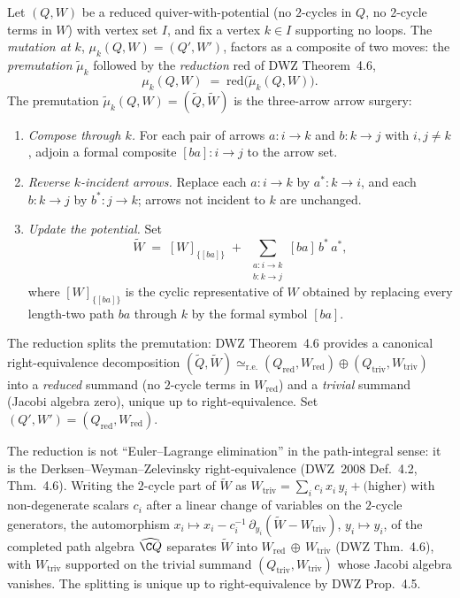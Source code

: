 \begin{definition}
\label{def:mutation-qp}
Let $(Q, W)$ be a reduced quiver-with-potential
(no $2$-cycles in $Q$, no $2$-cycle terms in $W$) with vertex set $I$, and
fix a vertex $k \in I$ supporting no loops. The \emph{mutation at $k$},
$\mu_k(Q, W) = (Q', W')$, factors as a composite of two moves:
the \emph{premutation} $\tilde\mu_k$ followed by the \emph{reduction}
$\mathrm{red}$ of DWZ Theorem~4.6,
\[
 \mu_k(Q, W) \;=\; \mathrm{red}\bigl(\tilde\mu_k(Q, W)\bigr).
\]
The premutation $\tilde\mu_k(Q, W) = (\tilde Q, \tilde W)$ is the three-arrow
arrow surgery:
\begin{enumerate}
\item[(M1)] \emph{Compose through $k$.} For each pair of arrows
$a \colon i \to k$ and $b \colon k \to j$ with $i, j \neq k$, adjoin a
formal composite $[ba] \colon i \to j$ to the arrow set.
\item[(M2)] \emph{Reverse $k$-incident arrows.} Replace each
$a \colon i \to k$ by $a^{*} \colon k \to i$, and each $b \colon k \to j$
by $b^{*} \colon j \to k$; arrows not incident to $k$ are unchanged.
\item[(M3)] \emph{Update the potential.} Set
\[
 \tilde W \;=\; [W]_{\{[ba]\}} \;+\; \sum_{\substack{a \colon i \to k \\ b \colon k \to j}}
 [ba]\, b^{*}\, a^{*},
\]
where $[W]_{\{[ba]\}}$ is the cyclic representative of $W$ obtained by
replacing every length-two path $ba$ through $k$ by the formal symbol $[ba]$.
\end{enumerate}
The reduction splits the premutation: DWZ Theorem~4.6 provides a canonical
right-equivalence decomposition
$(\tilde Q, \tilde W) \simeq_{\mathrm{r.e.}} (Q_{\mathrm{red}},
W_{\mathrm{red}}) \oplus (Q_{\mathrm{triv}}, W_{\mathrm{triv}})$
into a \emph{reduced} summand (no $2$-cycle terms in $W_{\mathrm{red}}$) and
a \emph{trivial} summand (Jacobi algebra zero), unique up to right-equivalence.
Set $(Q', W') = (Q_{\mathrm{red}}, W_{\mathrm{red}})$.
\end{definition}

The reduction is not ``Euler--Lagrange elimination'' in the path-integral
sense: it is the Derksen--Weyman--Zelevinsky right-equivalence
(DWZ~2008 Def.~4.2, Thm.~4.6). Writing the $2$-cycle part of $\tilde W$ as
$W_{\mathrm{triv}} = \sum_{i} c_i\, x_i\, y_i + \text{(higher)}$ with
non-degenerate scalars $c_i$ after a linear change of variables on the
$2$-cycle generators, the automorphism
$x_i \mapsto x_i - c_i^{-1}\, \partial_{y_i}(\tilde W - W_{\mathrm{triv}})$,
$y_i \mapsto y_i$, of the completed path algebra
$\widehat{\C Q}$ separates $\tilde W$ into
$W_{\mathrm{red}}\, \oplus\, W_{\mathrm{triv}}$ (DWZ Thm.~4.6), with
$W_{\mathrm{triv}}$ supported on the trivial summand $(Q_{\mathrm{triv}},
W_{\mathrm{triv}})$ whose Jacobi algebra vanishes. The splitting is unique
up to right-equivalence by DWZ Prop.~4.5.

